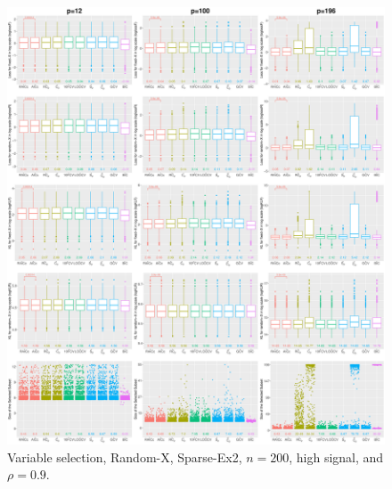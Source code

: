 \begin{figure}[!ht]
\centering
\includegraphics[width=\textwidth]{figures/supplement/randomx/subset_selection/Sparse-Ex2_n200_hsnr_rho09.eps}
\caption{Variable selection, Random-X, Sparse-Ex2, $n=200$, high signal, and $\rho=0.9$.}
\end{figure}
\clearpage
